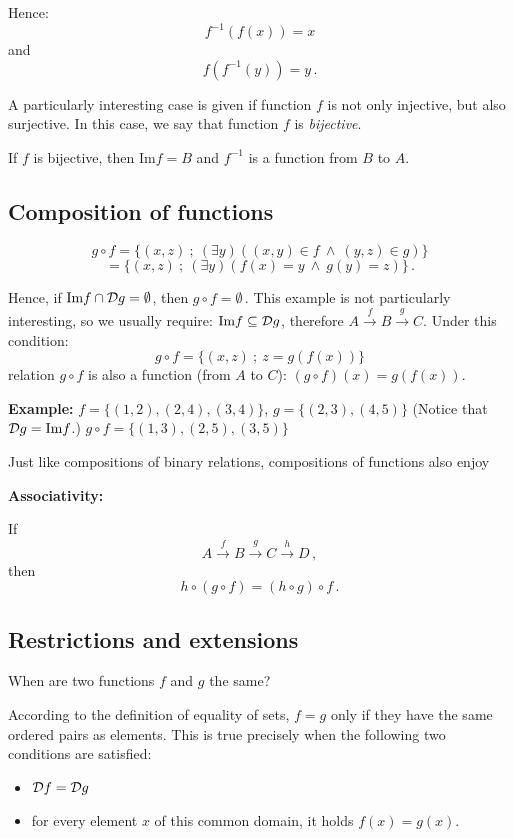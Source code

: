 \documentclass[11pt,paper=b5,footinclude,headinclude]{scrbook} %
\def\inn {{~\wedge~}}
\theoremstyle{remark}
\theoremstyle{definition} %
\theoremstyle{theorem} %
\begin{document}
Hence: $$f^{-1}(f(x)) = x$$
and
$$f(f^{-1}(y)) = y\,.$$

A particularly interesting case is given if function $f$ is not only injective, but also surjective.
In this case, we say that function $f$ is {\em bijective}.

If $f$ is bijective, then  $\textrm{Im}f = B$ and $f^{-1}$ is a function from $B$ to $A$.


%

\subsection{Composition of functions}
$$g\circ f = \{(x,z)~;~(\exists y)((x,y)\in f\inn (y,z)\in g)\}$$
$$= \{(x,z)~;~(\exists y)(f(x) = y \inn g(y) = z)\}\,.$$

Hence, if $\textrm{Im}f\cap {\cal D}g = \emptyset$, then $g\circ f = \emptyset\,.$
This example is not particularly interesting, so we usually require: $\textrm{Im}f\subseteq {\cal D}g$,
therefore $A\overset{f}{\to} B\overset{g}{\to} C$.
Under this condition:
$$g\circ f = \{(x,z)~;~z = g(f(x))\}$$
relation $g\circ f$ is also a function (from $A$ to $C$): $(g\circ f)(x) = g(f(x))$.

\bigskip
\textbf{ Example:} $f = \{(1,2),(2,4),(3,4)\}$, $g = \{(2,3),(4,5)\}$
(Notice that ${\cal D}g = \textrm{Im}f$.)
$g\circ f = \{(1,3),(2,5), (3,5)\}$

\bigskip
Just like compositions of binary relations, compositions of functions also enjoy

\textbf{ Associativity:}

If
$$A\overset{f}{\to} B\overset{g}{\to} C\overset{h}{\to} D\,,$$
then
$$h\circ (g\circ f) = (h\circ g)\circ f\,.$$

\subsection{Restrictions and extensions}
When are two functions $f$ and $g$ the same?

According to the definition of equality of sets, $f = g$ only if they have the same ordered pairs as elements.
This is true precisely when the following two conditions are satisfied:
\begin{itemize}
  \item ${\cal D}f = {\cal D}g$
  \item for every element $x$ of this common domain, it holds $f(x) = g(x)$.
\end{itemize}
\end{document}
